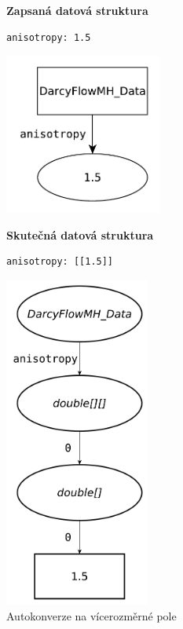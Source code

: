 \documentclass[FM,bw,DP]{tulthesis}
\begin{document}
\begin{figure}[ht]
\begin{minipage}[t]{0.45\linewidth}
\vspace{0pt}
\textbf{Zapsaná datová struktura}\\
\vspace{-5pt}
\begin{lstlisting}
anisotropy: 1.5
\end{lstlisting}
\vspace*{-20pt}
\begin{center}
\includegraphics[height=150pt]{../img/autoconversion_array_2_before.pdf}
\end{center}
\end{minipage}
\quad
\begin{minipage}[t]{0.45\linewidth}
\vspace{0pt}
\textbf{Skutečná datová struktura}\\
\vspace{-5pt}
\begin{lstlisting}
anisotropy: [[1.5]]
\end{lstlisting}
\vspace*{-20pt}
\begin{center}
\includegraphics[height=310pt]{../img/autoconversion_array_2_after.pdf}
\end{center}
\end{minipage}
\caption{Autokonverze na vícerozměrné pole}
\label{img:autoconversion_array_2}
\end{figure}	
\end{document}
